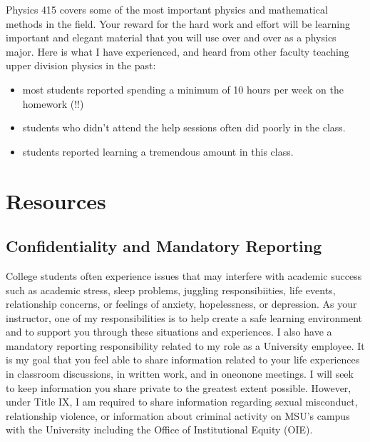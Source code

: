 \documentclass[letterpaper,10pt,english]{jupyterBook}
\begin{document}
\sphinxAtStartPar
Physics 415 covers some of the most important physics and mathematical methods in the field. Your reward for the hard work and effort will be learning important and elegant material that you will use over and over as a physics major. Here is what I have experienced, and heard from
other faculty teaching upper division physics in the past:
\begin{itemize}
\item {} 
\sphinxAtStartPar
most students reported spending a minimum of 10 hours per week on the
homework (!!)

\item {} 
\sphinxAtStartPar
students who didn’t attend the help sessions
often did poorly in the class.

\item {} 
\sphinxAtStartPar
students reported learning a tremendous amount in this class.

\end{itemize}

\sphinxAtStartPar
{}

\sphinxstepscope


\section{Resources}
\label{\detokenize{content/0_course/resources:resources}}\label{\detokenize{content/0_course/resources::doc}}

\subsection{Confidentiality and Mandatory Reporting}
\label{\detokenize{content/0_course/resources:confidentiality-and-mandatory-reporting}}
\sphinxAtStartPar
College students often experience issues that may interfere with academic success such as academic stress, sleep problems, juggling responsibiities, life events, relationship concerns, or feelings of anxiety, hopelessness, or depression.
As your instructor, one of my responsibilities is to help create a safe learning environment and to support you through these situations and experiences.
I also have a mandatory reporting responsibility related to my role as a University employee.
It is my goal that you feel able to share information related to your life experiences in classroom
discussions, in written work, and in one\sphinxhyphen{}on\sphinxhyphen{}one meetings.
I will seek to keep information you share private to the greatest extent possible.
However, under Title IX, I am required to share information regarding sexual misconduct, relationship violence, or information
about criminal activity on MSU’s campus with the University including the Office of Institutional Equity (OIE).
\end{document}
